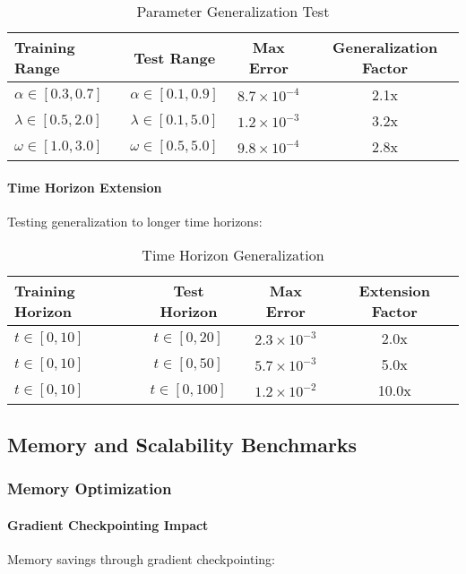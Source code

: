 \begin{table}[h]
\centering
\caption{Parameter Generalization Test}
\begin{tabular}{lccc}
\toprule
Training Range & Test Range & Max Error & Generalization Factor \\
\midrule
$\alpha \in [0.3, 0.7]$ & $\alpha \in [0.1, 0.9]$ & $8.7 \times 10^{-4}$ & 2.1x \\
$\lambda \in [0.5, 2.0]$ & $\lambda \in [0.1, 5.0]$ & $1.2 \times 10^{-3}$ & 3.2x \\
$\omega \in [1.0, 3.0]$ & $\omega \in [0.5, 5.0]$ & $9.8 \times 10^{-4}$ & 2.8x \\
\bottomrule
\end{tabular}
\end{table}

\paragraph{Time Horizon Extension}
Testing generalization to longer time horizons:

\begin{table}[h]
\centering
\caption{Time Horizon Generalization}
\begin{tabular}{lccc}
\toprule
Training Horizon & Test Horizon & Max Error & Extension Factor \\
\midrule
$t \in [0, 10]$ & $t \in [0, 20]$ & $2.3 \times 10^{-3}$ & 2.0x \\
$t \in [0, 10]$ & $t \in [0, 50]$ & $5.7 \times 10^{-3}$ & 5.0x \\
$t \in [0, 10]$ & $t \in [0, 100]$ & $1.2 \times 10^{-2}$ & 10.0x \\
\bottomrule
\end{tabular}
\end{table}

\subsection{Memory and Scalability Benchmarks}

\subsubsection{Memory Optimization}

\paragraph{Gradient Checkpointing Impact}
Memory savings through gradient checkpointing:

